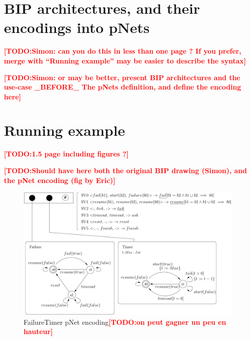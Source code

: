 \documentclass{lncs/llncs}
\newcommand{\TODO}[1]{\textcolor{red}{\textbf{[TODO:#1]}}}
\begin{document}
\section{BIP architectures, and their encodings into pNets}
\label{section:BIParchitectures}
\TODO{Simon: can you do this in less than one page ? If you prefer,
  merge with ``Running example'' may be easier to describe the syntax}

\TODO{Simon: or may be better, present BIP architectures and the use-case \_BEFORE\_ The pNets definition, and define the encoding here}

\section{Running example}
\label{section:FailureTimerMax}
\TODO{1.5 page including figures ?}


\TODO{Should have here both the original BIP drawing (Simon), and the
  pNet encoding (fig by Eric)}


\begin{figure}[t]
   \centerline{\includegraphics[width=12cm]{XFIG/FailureTimerPNET}}
   \caption{FailureTimer pNet encoding\TODO{on peut gagner un peu en hauteur}}  \label{schema:BIParchitecture}
 \end{figure}
\end{document}
